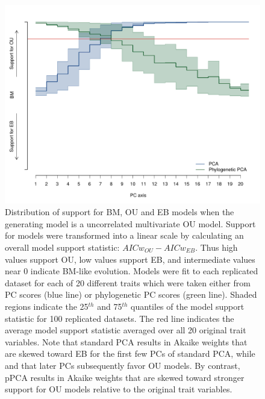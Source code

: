 \documentclass[12pt,twoside]{article}
\begin{document}
\begin{figure}[p]
\centering
\includegraphics[scale=0.65]{./fig/uncor-ou-aic.pdf}
\caption[Model support when generating model is uncorrelated OU]{Distribution of support for BM, OU and EB models when the generating model is a uncorrelated multivariate OU model. Support for models were transformed into a linear scale by calculating an overall model support statistic: $AICw_{OU} - AICw_{EB}$. Thus high values support OU, low values support EB, and intermediate values near 0 indicate BM-like evolution. Models were fit to each replicated dataset for each of 20 different traits which were taken either from PC scores (blue line) or phylogenetic PC scores (green line). Shaded regions indicate the 25$^{th}$ and 75$^{th}$ quantiles of the model support statistic for 100 replicated datasets. The red line indicates the average model support statistic averaged over all 20 original trait variables. Note that standard PCA results in Akaike weights that are skewed toward EB for the first few PCs of standard PCA, while  and that later PCs subsequently favor OU models. By contrast, pPCA results in Akaike weights that are skewed toward stronger support for OU models relative to the original trait variables.}
\label{oufit}
\end{figure}
\end{document}
